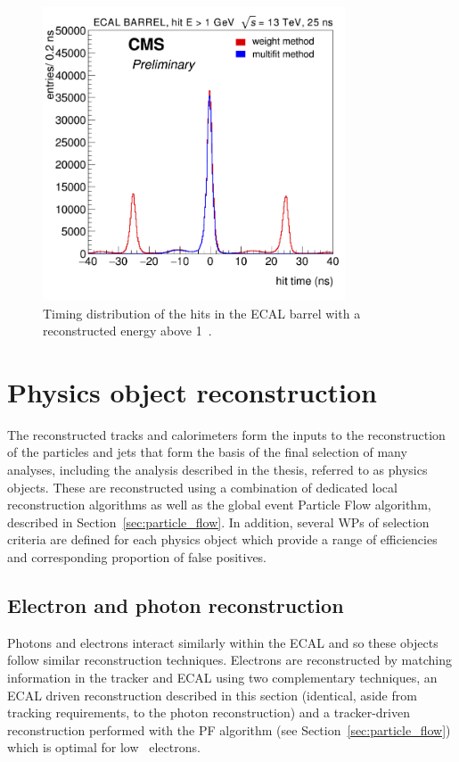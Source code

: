 \begin{figure}
\centering
    \includegraphics[width=0.8\textwidth]{./Figures/reconstruction/timing_barrel_linear.png}
  \caption{Timing distribution of the hits in the ECAL barrel with a reconstructed energy above 1\GeV~\cite{ecal_timing}.}
  \label{fig:timing_barrel_linear}
\end{figure}

\section{Physics object reconstruction}

The reconstructed tracks and calorimeters form the inputs to the reconstruction of the particles and 
jets that form the basis of the final selection of many analyses, including the analysis described 
in the thesis, referred to as physics objects. These are reconstructed using a combination of
dedicated local reconstruction algorithms as well as the global event Particle
Flow algorithm, described in Section~\ref{sec:particle_flow}.
In addition, several WPs of selection criteria are defined for each physics object 
which provide a range of efficiencies and corresponding proportion of false positives. 

\subsection{Electron and photon reconstruction}
\label{sec:ele_pho_reco}

Photons and electrons interact similarly within the ECAL and so these objects 
follow similar reconstruction techniques. Electrons are reconstructed by matching 
information in the tracker and ECAL using two complementary techniques, an ECAL driven 
reconstruction described in this section (identical, aside from tracking
requirements, to the photon reconstruction) and a tracker-driven reconstruction performed with
the PF algorithm (see Section~\ref{sec:particle_flow}) which is optimal for low \pt~electrons. 

